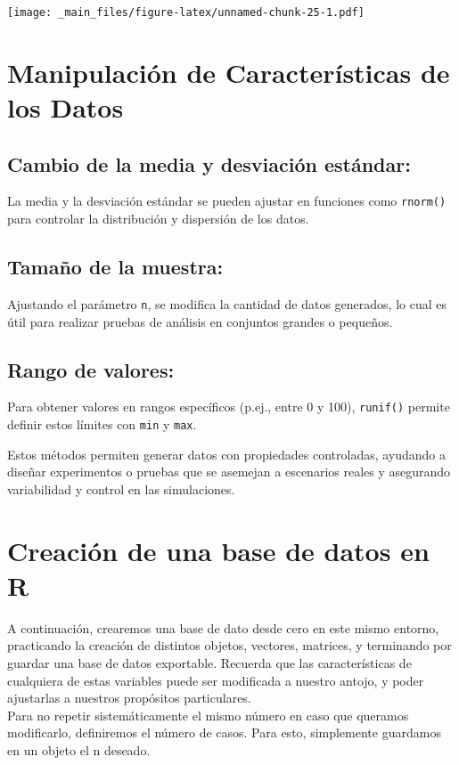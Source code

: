 \documentclass[
]{book}
\begin{document}
\texttt{[image: \_main\_files/figure-latex/unnamed-chunk-25-1.pdf]}

\section{Manipulación de Características de los Datos}\label{manipulaciuxf3n-de-caracteruxedsticas-de-los-datos}

\subsection{Cambio de la media y desviación estándar:}\label{cambio-de-la-media-y-desviaciuxf3n-estuxe1ndar}

La media y la desviación estándar se pueden ajustar en funciones como \texttt{rnorm()} para controlar la distribución y dispersión de los datos.

\subsection{Tamaño de la muestra:}\label{tamauxf1o-de-la-muestra}

Ajustando el parámetro \texttt{n}, se modifica la cantidad de datos generados, lo cual es útil para realizar pruebas de análisis en conjuntos grandes o pequeños.

\subsection{Rango de valores:}\label{rango-de-valores}

Para obtener valores en rangos específicos (p.ej., entre 0 y 100), \texttt{runif()} permite definir estos límites con \texttt{min} y \texttt{max}.

Estos métodos permiten generar datos con propiedades controladas, ayudando a diseñar experimentos o pruebas que se asemejan a escenarios reales y asegurando variabilidad y control en las simulaciones.

\section{Creación de una base de datos en R}\label{creaciuxf3n-de-una-base-de-datos-en-r}

A continuación, crearemos una base de dato desde cero en este mismo entorno, practicando la creación de distintos objetos, vectores, matrices, y terminando por guardar una base de datos exportable. Recuerda que las características de cualquiera de estas variables puede ser modificada a nuestro antojo, y poder ajustarlas a nuestros propósitos particulares.\\
Para no repetir sistemáticamente el mismo número en caso que queramos modificarlo, definiremos el número de casos. Para esto, simplemente guardamos en un objeto el n deseado.
\end{document}
